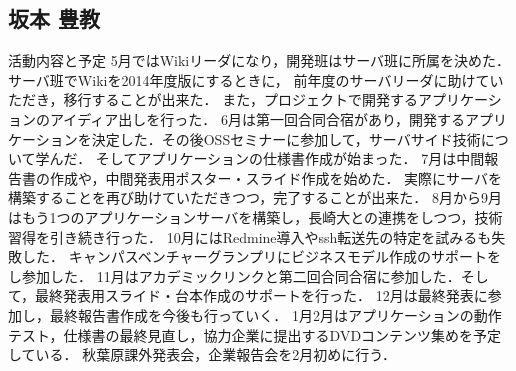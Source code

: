 \subsection{坂本 豊教}
\par
活動内容と予定
5月ではWikiリーダになり，開発班はサーバ班に所属を決めた．サーバ班でWikiを2014年度版にするときに，
前年度のサーバリーダに助けていただき，移行することが出来た．
また，プロジェクトで開発するアプリケーションのアイディア出しを行った．
6月は第一回合同合宿があり，開発するアプリケーションを決定した．その後OSSセミナーに参加して，サーバサイド技術について学んだ．
そしてアプリケーションの仕様書作成が始まった．
7月は中間報告書の作成や，中間発表用ポスター・スライド作成を始めた．
実際にサーバを構築することを再び助けていただきつつ，完了することが出来た．
8月から9月はもう1つのアプリケーションサーバを構築し，長崎大との連携をしつつ，技術習得を引き続き行った．
10月にはRedmine導入やssh転送先の特定を試みるも失敗した．
キャンパスベンチャーグランプリにビジネスモデル作成のサポートをし参加した．
11月はアカデミックリンクと第二回合同合宿に参加した．そして，最終発表用スライド・台本作成のサポートを行った．
12月は最終発表に参加し，最終報告書作成を今後も行っていく．
1月2月はアプリケーションの動作テスト，仕様書の最終見直し，協力企業に提出するDVDコンテンツ集めを予定している．
秋葉原課外発表会，企業報告会を2月初めに行う．

